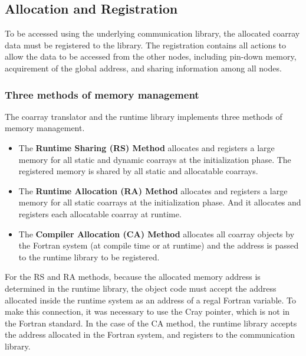 \subsection{Allocation and Registration}

To be accessed using the underlying communication library,
the allocated coarray data must be registered to the library.
The registration contains all actions to allow the data to be accessed 
from the other nodes, including pin-down memory, acquirement of the global address,
and sharing information among all nodes.

\subsubsection{Three methods of memory management}

The coarray translator and the runtime library implements three methods of
memory management.
\begin{itemize}
\item
The {\bf Runtime Sharing (RS) Method} allocates and registers a large memory 
for all static and dynamic coarrays at the initialization phase.
The registered memory is shared by all static and allocatable coarrays. 

\item
The {\bf Runtime Allocation (RA) Method} allocates and registers a large memory
for all static coarrays at the initialization phase.
And it allocates and registers each allocatable coarray at runtime.

\item
The {\bf Compiler Allocation (CA) Method} allocates all coarray objects by 
the Fortran system (at compile time or at runtime) and the address is 
passed to the runtime library to be registered.
\end{itemize}

For the RS and RA methods, 
because the allocated memory address is determined in the runtime library, 
the object code must accept the address allocated 
inside the runtime system as an address of a regal Fortran variable.
To make this connection, it was necessary to use the Cray pointer, which is not 
in the Fortran standard.
In the case of the CA method, the runtime library accepts the address allocated
in the Fortran system, and registers to the communication library.

